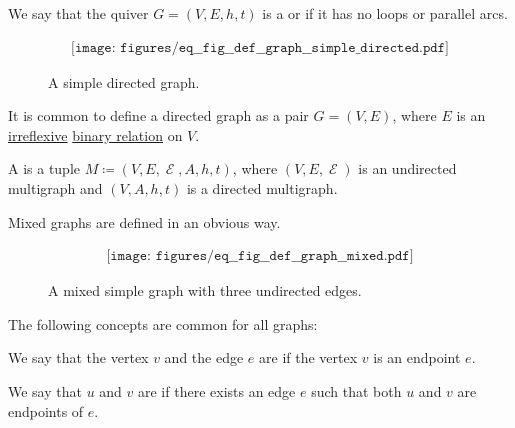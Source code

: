 \begin{definition}
\begin{thmenum}[series=def:graph]
     We say that the quiver \( G = (V, E, h, t) \) is a  or  if it has no loops or parallel arcs.

    \begin{figure}[h]
      \begin{equation}\label{eq:fig:def:graph/simple_directed}
        \begin{aligned}
          \texttt{[image: figures/eq\_\_fig\_\_def\_\_graph\_\_simple\_directed.pdf]}
        \end{aligned}
      \end{equation}
      \caption{A simple directed graph.}\label{fig:def:graph/simple_directed}
    \end{figure}

    It is common to define a directed graph as a pair \( G = (V, E) \), where \( E \) is an \hyperref[def:binary_relation/irreflexive]{irreflexive} \hyperref[def:binary_relation]{binary relation} on \( V \).

     A  is a tuple \( M \coloneqq (V, E, \mscrE, A, h, t) \), where \( (V, E, \mscrE) \) is an undirected multigraph and \( (V, A, h, t) \) is a directed multigraph.

    Mixed graphs are defined in an obvious way.

    \begin{figure}[h]
      \begin{equation}\label{eq:fig:def:graph/mixed}
        \begin{aligned}
          \texttt{[image: figures/eq\_\_fig\_\_def\_\_graph\_\_mixed.pdf]}
        \end{aligned}
      \end{equation}
      \caption{A mixed simple graph with three undirected edges.}\label{fig:def:graph/mixed}
    \end{figure}
  \end{thmenum}

  The following concepts are common for all graphs:
  \begin{thmenum}[resume=def:graph]
     We say that the vertex \( v \) and the edge \( e \) are  if the vertex \( v \) is an endpoint \( e \).

     We say that \( u \) and \( v \) are  if there exists an edge \( e \) such that both \( u \) and \( v \) are endpoints of \( e \).


\end{thmenum}
\end{definition}
